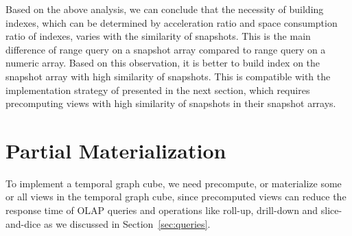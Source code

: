\documentclass[10pt,journal,compsoc]{IEEEtran}
\begin{document}
Based on the above analysis, we can conclude that the necessity of building indexes, which can be determined by acceleration ratio and space consumption ratio of indexes, varies with the similarity of snapshots. This is the main difference of range query on a snapshot array compared to range query on a numeric array. Based on this observation, it is better to build index on the snapshot array with high similarity of snapshots. This is compatible with the implementation strategy of  presented in the next section, which requires precomputing views with high similarity of snapshots in their snapshot arrays.


\section{Partial Materialization} \label{sec:partial_materialization}
To implement a temporal graph cube, we need precompute, or materialize some or all views in the temporal graph cube, since precomputed views can reduce the response time of OLAP queries and operations like roll-up, drill-down and slice-and-dice as we discussed in Section~\ref{sec:queries}.
\end{document}
